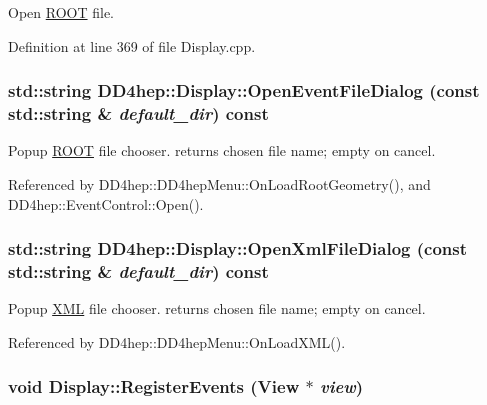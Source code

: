 Open \hyperlink{namespace_r_o_o_t}{ROOT} file. 

Definition at line 369 of file Display.cpp.\hypertarget{class_d_d4hep_1_1_display_a6d465f217d173aef4046212a724bfc3b}{
\subsubsection[{OpenEventFileDialog}]{\setlength{\rightskip}{0pt plus 5cm}std::string DD4hep::Display::OpenEventFileDialog (const std::string \& {\em default\_\-dir}) const}}
\label{class_d_d4hep_1_1_display_a6d465f217d173aef4046212a724bfc3b}


Popup \hyperlink{namespace_r_o_o_t}{ROOT} file chooser. returns chosen file name; empty on cancel. 

Referenced by DD4hep::DD4hepMenu::OnLoadRootGeometry(), and DD4hep::EventControl::Open().\hypertarget{class_d_d4hep_1_1_display_ad88a62cc1e8be8b6efb31db8771930d3}{
\subsubsection[{OpenXmlFileDialog}]{\setlength{\rightskip}{0pt plus 5cm}std::string DD4hep::Display::OpenXmlFileDialog (const std::string \& {\em default\_\-dir}) const}}
\label{class_d_d4hep_1_1_display_ad88a62cc1e8be8b6efb31db8771930d3}


Popup \hyperlink{namespace_d_d4hep_1_1_x_m_l}{XML} file chooser. returns chosen file name; empty on cancel. 

Referenced by DD4hep::DD4hepMenu::OnLoadXML().\hypertarget{class_d_d4hep_1_1_display_ab1c06999ce5655dc960771f8082a1710}{
\subsubsection[{RegisterEvents}]{\setlength{\rightskip}{0pt plus 5cm}void Display::RegisterEvents ({\bf View} $\ast$ {\em view})}}
\label{class_d_d4hep_1_1_display_ab1c06999ce5655dc960771f8082a1710}


